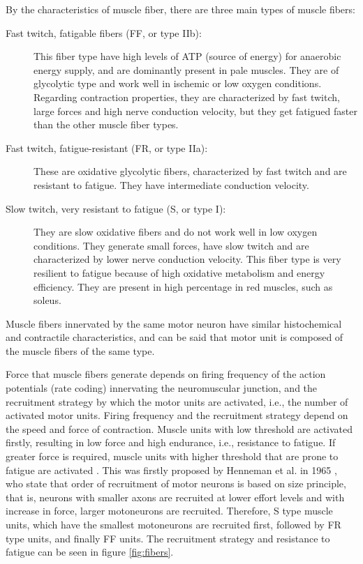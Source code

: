 By the characteristics of muscle fiber, there are three main types of muscle fibers:
\begin{description}
\item[Fast twitch, fatigable fibers (FF, or type IIb):] This fiber type have high levels of ATP (source of energy) for anaerobic energy supply, and are dominantly present in pale muscles. They are of glycolytic type and work well in ischemic or low oxygen conditions. Regarding contraction properties, they are characterized by fast twitch, large forces and high nerve conduction velocity, but they get fatigued faster than the other muscle fiber types. 

\item[Fast twitch, fatigue-resistant (FR, or type IIa):] These are oxidative glycolytic fibers, characterized by fast twitch and are resistant to fatigue. They have intermediate conduction velocity. 

\item[Slow twitch, very resistant to fatigue (S, or type I):] They are slow oxidative fibers and do not work well in low oxygen conditions. They generate small forces, have slow twitch and are characterized by lower nerve conduction velocity. This fiber type is very resilient to fatigue because of high oxidative metabolism and energy efficiency. They are present in high percentage in red muscles, such as soleus.
\end{description}

Muscle fibers innervated by the same motor neuron have similar histochemical and contractile characteristics, and can be said that motor unit is composed of the muscle fibers of the same type.

Force that muscle fibers generate depends on firing frequency of the action potentials (rate coding) innervating the neuromuscular junction, and the recruitment strategy by which the motor units are activated, i.e., the number of activated motor units. Firing frequency and the recruitment strategy depend on the speed and force of contraction. Muscle units with low threshold are activated firstly, resulting in low force and high endurance, i.e., resistance to fatigue. If greater force is required, muscle units with higher threshold that are prone to fatigue are activated \citep{Freund1975, Merletti-book}. This was firstly proposed by Henneman et al. in 1965 \citep{Henneman1965}, who state that order of recruitment of motor neurons is based on size principle, that is, neurons with smaller axons are recruited at lower effort levels and with increase in force, larger motoneurons are recruited. Therefore, S type muscle units, which have the smallest motoneurons are recruited first, followed by FR type units, and finally FF units. The recruitment strategy and resistance to fatigue can be seen in figure \ref{fig:fibers}. 

